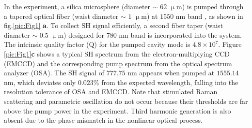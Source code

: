 \documentclass[a4paper,8pt,hyperref, twocolumn]{article}
\begin{document}
In the experiment, a silica microsphere (diameter $\sim$ $62$ $\upmu$m) 
is pumped through a tapered optical fiber (waist diameter $\sim$ $1$ $\upmu$m) at $1550$ nm band \cite{knight1997phase, cai2000observation}, as shown in fig.\ref{pic:Fig1} \textbf{a}. To collect SH signal efficiently, a second fiber taper (waist diameter $\sim$ 0.5 $\upmu$m) designed for 780 nm band is incorporated into the system. The intrinsic quality factor (Q) for the pumped cavity mode is $4.8\times10^7$. %
Figure \ref{pic:Fig1}\textbf{c} shows a typical SH spectrum from the electron-multiplying CCD (EMCCD) and the corresponding pump spectrum from the optical spectrum analyzer (OSA). The SH signal of $777.75$ nm appears when pumped at $1555.14$ nm, which deviates only $0.023$\% from the expected wavelength, falling into the resolution tolerance of OSA and EMCCD.
Note that stimulated Raman scattering and parametric oscillation do not occur because their thresholds are far above the pump power in the experiment. %
Third harmonic generation is also absent due to the phase mismatch in the nonlinear optical process.
\end{document}
